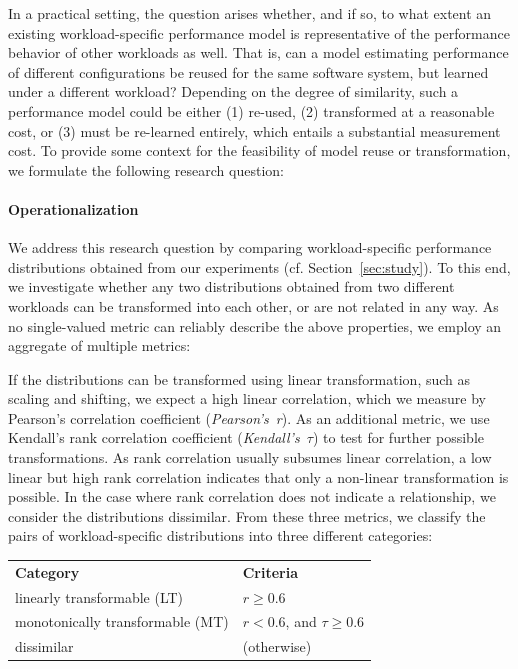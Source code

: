In a practical setting, the question arises whether, and if so, to what extent an existing workload-specific performance model is representative of the performance behavior of other workloads as well. 
That is, can a model estimating performance of different configurations be reused for the same software system, but learned under a different workload?
Depending on the degree of similarity, such a performance model could be either (1) re-used, (2) transformed at a reasonable cost, or (3) must be re-learned entirely, which entails a substantial measurement cost. To provide some context for the feasibility of model reuse or transformation, we formulate the following research question: 


\paragraph*{Operationalization}
We address this research question by comparing workload-specific performance distributions obtained from our experiments (cf. Section~\ref{sec:study}). To this end, we investigate whether any two distributions obtained from two different workloads can be transformed into each other, or are not related in any way. As no single-valued metric can reliably describe the above properties, we employ an aggregate of multiple metrics: 

If the distributions can be transformed using linear transformation, such as scaling and shifting, we expect a high linear correlation, which we measure by Pearson’s correlation coefficient (\emph{Pearson's~r}). As an additional metric, we use Kendall’s rank correlation coefficient (\emph{Kendall's~$\tau$}) to test for further possible transformations. As rank correlation usually subsumes linear correlation, a low linear but high rank correlation indicates that only a non-linear transformation is possible. In the case where rank correlation does not indicate a relationship, we consider the distributions dissimilar. From these three metrics, we classify the pairs of workload-specific distributions into three different categories:
\vspace{1mm}

\begin{tabular}{p{4.4cm}l}
	 \textbf{Category} & \textbf{Criteria} \\
	{linearly transformable (LT)} & $r \geq 0.6$ \\
	{monotonically transformable (MT)} & $r < 0.6$, and $\tau \geq 0.6$ \\
	{dissimilar}  & (otherwise) \\%
\end{tabular}


